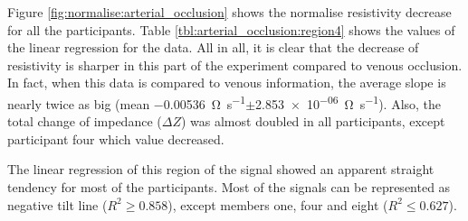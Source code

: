 Figure \ref{fig:normalise:arterial_occlusion} shows the normalise resistivity decrease for all the participants. Table \ref{tbl:arterial_occlusion:region4} shows the values of the linear regression for the data.   All in all, it is clear that the decrease of resistivity is sharper in this part of the experiment compared to venous occlusion.  In fact, when this data is compared to venous information, the average slope is nearly twice as big (mean \SI{-0.00536}{\ohm\per\second}$\pm$\SI{2.853e-06}{\ohm\per\second}). Also, the total change of impedance ($\Delta Z$) was almost doubled in all participants, except participant four which value decreased.  

The linear regression of this region of the signal showed an apparent straight tendency for most of the participants. Most of the signals can be represented as negative tilt line ($R^2 \geq 0.858 $), except members one, four and eight ($R^2 \leq 0.627 $).



